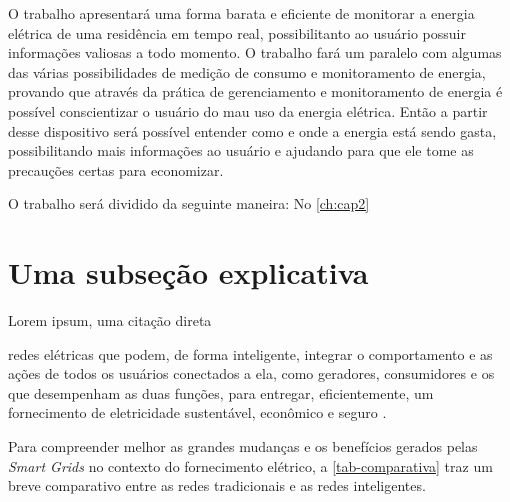 O trabalho apresentará uma forma barata e eficiente de monitorar a energia elétrica de uma residência em tempo real, possibilitanto ao usuário
possuir informações valiosas a todo momento. O trabalho fará um paralelo com algumas das várias possibilidades de medição de consumo e monitoramento
de energia, provando que através da prática de gerenciamento e monitoramento de energia é possível conscientizar o usuário do mau uso da energia elétrica.
Então a partir desse dispositivo será possível entender como e onde a energia está sendo gasta, possibilitando mais informações ao usuário e ajudando para
que ele tome as precauções certas para economizar.

O trabalho será dividido da seguinte maneira: No \autoref{ch:cap2}




\section{Uma subseção explicativa}

Lorem ipsum, uma citação direta 

\begin{citacao}[brazil]
[...] redes elétricas que podem, de forma inteligente, integrar o comportamento e as ações de todos os usuários conectados a ela, como geradores, consumidores e os que desempenham as duas funções, para entregar, eficientemente, um fornecimento de eletricidade sustentável, econômico e seguro \cite[p. 51, tradução livre]{yu2011new}.
\end{citacao}

Para compreender melhor as grandes mudanças e os benefícios gerados pelas \textit{Smart Grids} no contexto do fornecimento elétrico, a \autoref{tab-comparativa} traz um breve comparativo entre as redes tradicionais e as redes inteligentes.

